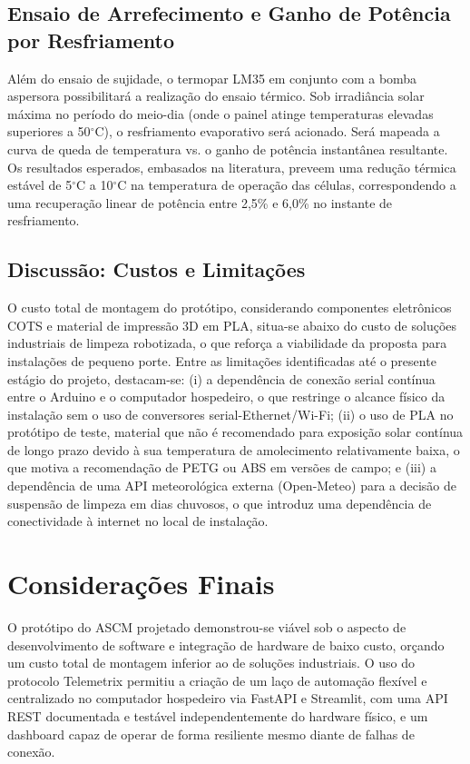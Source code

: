 \documentclass[12pt, a4paper]{article}
\begin{document}
\subsection{Ensaio de Arrefecimento e Ganho de Potência por Resfriamento}

Além do ensaio de sujidade, o termopar LM35 em conjunto com a bomba aspersora possibilitará a realização do ensaio térmico. Sob irradiância solar máxima no período do meio-dia (onde o painel atinge temperaturas elevadas superiores a 50$^\circ$C), o resfriamento evaporativo será acionado. Será mapeada a curva de queda de temperatura vs. o ganho de potência instantânea resultante. Os resultados esperados, embasados na literatura, preveem uma redução térmica estável de 5$^\circ$C a 10$^\circ$C na temperatura de operação das células, correspondendo a uma recuperação linear de potência entre 2,5\% e 6,0\% no instante de resfriamento.

\subsection{Discussão: Custos e Limitações}

O custo total de montagem do protótipo, considerando componentes eletrônicos COTS e material de impressão 3D em PLA, situa-se abaixo do custo de soluções industriais de limpeza robotizada, o que reforça a viabilidade da proposta para instalações de pequeno porte. Entre as limitações identificadas até o presente estágio do projeto, destacam-se: (i) a dependência de conexão serial contínua entre o Arduino e o computador hospedeiro, o que restringe o alcance físico da instalação sem o uso de conversores serial-Ethernet/Wi-Fi; (ii) o uso de PLA no protótipo de teste, material que não é recomendado para exposição solar contínua de longo prazo devido à sua temperatura de amolecimento relativamente baixa, o que motiva a recomendação de PETG ou ABS em versões de campo; e (iii) a dependência de uma API meteorológica externa (Open-Meteo) para a decisão de suspensão de limpeza em dias chuvosos, o que introduz uma dependência de conectividade à internet no local de instalação.

\section{Considerações Finais}
\label{sec:conclusao}

O protótipo do ASCM projetado demonstrou-se viável sob o aspecto de desenvolvimento de software e integração de hardware de baixo custo, orçando um custo total de montagem inferior ao de soluções industriais. O uso do protocolo Telemetrix permitiu a criação de um laço de automação flexível e centralizado no computador hospedeiro via FastAPI e Streamlit, com uma API REST documentada e testável independentemente do hardware físico, e um dashboard capaz de operar de forma resiliente mesmo diante de falhas de conexão.
\end{document}
